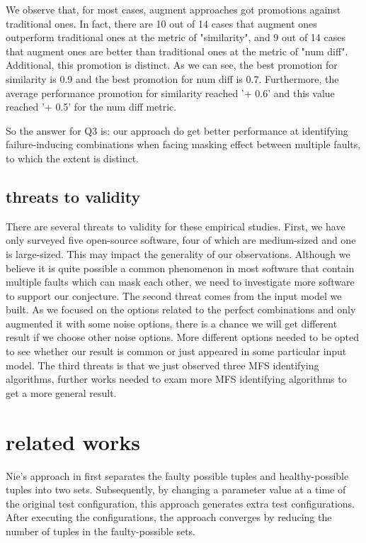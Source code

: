 \documentclass{sig-alternate}
\begin{document}
We observe that, for most cases, augment approaches got promotions against traditional ones. In fact, there are 10 out of 14 cases that augment ones outperform traditional ones at the metric of "similarity", and 9 out of 14 cases that augment ones are better than traditional ones at the metric of "num diff". Additional, this promotion is distinct. As we can see, the best promotion for similarity is 0.9 and the best promotion for num diff is 0.7. Furthermore, the average performance promotion for similarity reached '+ 0.6' and this value reached '+ 0.5' for the num diff metric.

So the answer for Q3 is: our approach do get better performance at identifying failure-inducing combinations when facing masking effect between multiple faults, to which the extent is distinct.

\subsection{threats to validity}
There are several threats to validity for these empirical studies. First, we have only surveyed five open-source software, four of which are medium-sized and one is large-sized. This may impact the generality of our observations. Although we believe it is quite possible a common phenomenon in most software that contain multiple faults which can mask each other, we need to investigate more software to support our conjecture. The second threat comes from the input model we built. As we focused on the options related to the perfect combinations and only augmented it with some noise options, there is a chance we will get different result if we choose other noise options. More different options needed to be opted to see whether our result is common or just appeared in some particular input model. The third threats is that we just observed three MFS identifying algorithms, further works needed to exam more MFS identifying algorithms to get a more general result.

\section{related works}

Nie's approach in \cite{nie2011minimal} first separates the faulty possible tuples and healthy-possible tuples into two sets. Subsequently, by changing a parameter value at a time of the original test configuration, this approach generates extra test configurations. After executing the configurations, the approach converges by reducing the number of tuples in the faulty-possible sets.
\end{document}

